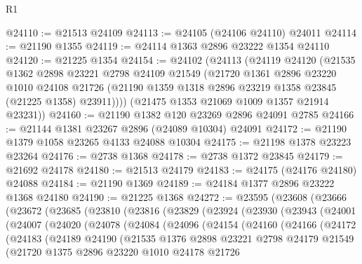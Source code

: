 \begin{lexlean}{R1}
\begin{coremodule}
@24110 := @21513 @24109
@24113 := @24105 (@24106 @24110) @24011
@24114 := @21190 @1355
@24119 := @24114 @1363 @2896 @23222 @1354 @24110
@24120 := @21225 @1354
@24154 := @24102
    (@24113
      (@24119
        @24120
        (@21535
          @1362
          @2898
          @23221
          @2798
          @24109
          @21549
          (@21720
            @1361
            @2896
            @23220
            @1010
            @24108
            @21726
            (@21190 @1359 @1318 @2896 @23219 @1358 @23845 (@21225 @1358) @23911))))
      (@21475 @1353 @21069 @1009 @1357 @21914 @23231))
@24160 := @21190 @1382 @120 @23269 @2896 @24091 @2785
@24166 := @21144 @1381 @23267 @2896 (@24089 @10304) @24091
@24172 := @21190 @1379 @1058 @23265 @4133 @24088 @10304
@24175 := @21198 @1378 @23223 @23264
@24176 := @2738 @1368
@24178 := @2738 @1372 @23845
@24179 := @21692 @24178
@24180 := @21513 @24179
@24183 := @24175 (@24176 @24180) @24088
@24184 := @21190 @1369
@24189 := @24184 @1377 @2896 @23222 @1368 @24180
@24190 := @21225 @1368
@24272 := @23595
    (@23608
      (@23666
        (@23672
          (@23685
            (@23810
              (@23816
                (@23829
                  (@23924
                    (@23930
                      (@23943
                        (@24001
                          (@24007
                            (@24020
                              (@24078
                                (@24084
                                  (@24096
                                    (@24154
                                      (@24160
                                        (@24166
                                          (@24172
                                            (@24183
                                              (@24189
                                                @24190
                                                (@21535
                                                  @1376
                                                  @2898
                                                  @23221
                                                  @2798
                                                  @24179
                                                  @21549
                                                  (@21720
                                                    @1375
                                                    @2896
                                                    @23220
                                                    @1010
                                                    @24178
                                                    @21726

\end{coremodule}
\end{lexlean}
